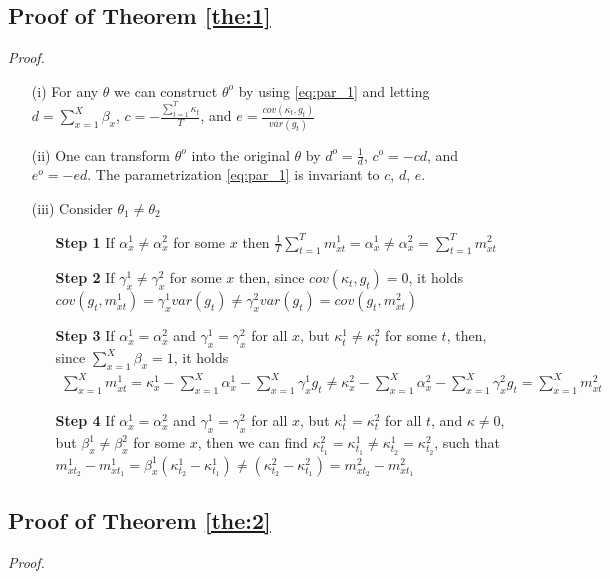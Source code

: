 \documentclass[AER, draftmode]{AEA}
\begin{document}
\subsection{Proof of Theorem \ref{the:1}}
\textit{Proof.}

\begin{enumerate}
	\item[(i)] For any $\theta$ we can construct $\theta^o$ by using \ref{eq:par_1} and letting $ d = \sum_{x=1}^{X} \beta_x$, $ c = - \frac{\sum_{t=1}^{T} \kappa_t}{T}$, and $e = \frac{cov(\kappa_t, g_t)}{var(g_t)}$
	\item[(ii)] One can transform $\theta^o$ into the original $\theta$ by $d^o = \frac{1}{d}$, $c^o = -cd$, and $e^o = -ed$. The parametrization \ref{eq:par_1} is invariant to $c$, $d$, $e$.
	\item[(iii)] Consider $\theta_1 \neq \theta_2$
	\begin{enumerate}
		\item [\textbf{Step 1}] If $\alpha_x^1 \neq \alpha_x^2$ for some $x$ then $\frac{1}{T} \sum_{t=1}^{T} m_{xt}^1 = \alpha_x^1 \neq \alpha_x^2 = \sum_{t=1}^{T} m_{xt}^2$
		\item [\textbf{Step 2}] If $\gamma_x^1 \neq \gamma_x^2$ for some $x$ then, since $cov(\kappa_t, g_t)=0$, it holds $cov(g_t, m_{xt}^1)= \gamma_x^1 var(g_t) \neq \gamma_x^2 var(g_t) = cov(g_t, m_{xt}^2)$
		\item [\textbf{Step 3}] If $\alpha_x^1=\alpha_x^2$ and $\gamma_x^1=\gamma_x^2$ for all $x$, but $\kappa_t^1 \neq \kappa_t^2$ for some $t$, then, since $\sum_{x=1}^{X} \beta_x =1$, it holds
		\begin{align*}
			\sum_{x=1}^{X}m_{xt}^1 = \kappa_x^1 - \sum_{x=1}^{X} \alpha_x^1 - \sum_{x=1}^X \gamma_x^1 g_t \neq \kappa_x^2 - \sum_{x=1}^{X} \alpha_x^2 - \sum_{x=1}^X \gamma_x^2 g_t = \sum_{x=1}^{X}m_{xt}^2 
		\end{align*}
		\item [\textbf{Step 4}] If $\alpha_x^1=\alpha_x^2$ and $\gamma_x^1=\gamma_x^2$ for all $x$, but $\kappa_t^1 = \kappa_t^2$ for all $t$, and $\kappa \neq 0$, but $\beta_x^1 \neq \beta_x^2$ for some $x$, then we can find $\kappa_{t_1}^2 = \kappa_{t_1}^1 \neq \kappa_{t_2}^1 = \kappa_{t_2}^2$, such that $m_{xt_2}^1- m_{xt_1}^1 = \beta_x^1 (\kappa_{t_2}^1-\kappa_{t_1}^1) \neq (\kappa_{t_2}^2-\kappa_{t_1}^2) = m_{xt_2}^2- m_{xt_1}^2$
	\end{enumerate}
\end{enumerate}

\subsection{Proof of Theorem \ref{the:2}}
\textit{Proof.}
\end{document}
